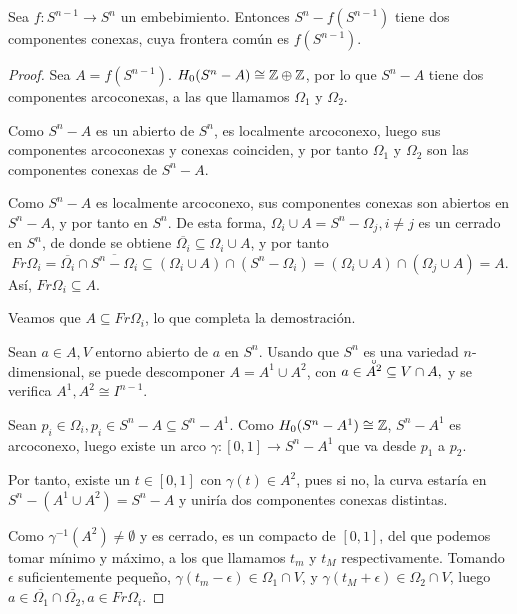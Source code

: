\begin{theorem}
  Sea $f \colon S^{n-1} \to S^n$ un embebimiento. Entonces $S^n - f(S^{n-1})$ tiene dos componentes conexas,
  cuya frontera común es $f(S^{n-1})$.
\end{theorem}

\begin{proof}
  Sea $A = f(S^{n-1})$. $H_0(S^n - A) \cong \mathbb{Z} \oplus \mathbb{Z}$, por lo que $S^n - A$ tiene dos componentes arcoconexas,
  a las que llamamos $\Omega_1$ y $\Omega_2$.

  Como $S^n - A$ es un abierto de $S^n$, es localmente arcoconexo, luego sus componentes arcoconexas y conexas coinciden,
  y por tanto $\Omega_1$ y $\Omega_2$ son las componentes conexas de $S^n - A$.

  Como $S^n - A$ es localmente arcoconexo, sus componentes conexas son abiertos en $S^n -A$, y por tanto en $S^n$.
  De esta forma, $\Omega_i \cup A = S^n - \Omega_j, i \neq j$ es un cerrado en $S^n$, de donde se obtiene
  $\overline{\Omega_i} \subseteq \Omega_i \cup A$, y por tanto
  \[ Fr \Omega_i = \overline{\Omega_i} \cap \overline{S^n - \Omega_i} \subseteq (\Omega_i \cup A) \cap (S^n - \Omega_i) =
  (\Omega_i \cup A) \cap (\Omega_j \cup A) = A. \]
  Así, $Fr \Omega_i \subseteq A$.

  Veamos que $A \subseteq Fr \Omega_i$, lo que completa la demostración.

  Sean $a \in A, V$ entorno abierto de $a$ en $S^n$. Usando que $S^n$ es una variedad $n$-dimensional, se puede descomponer
  $A = A^1 \cup A^2$, con $a \in \interior{A^2} \subseteq V \cap A,$ y se verifica $A^1, A^2 \cong I^{n-1}$.

  Sean $p_i \in \Omega_i, p_i \in S^n - A \subseteq S^n - A^1$. Como $H_0(S^n - A^1) \cong \mathbb{Z}$, $S^n - A^1$ es arcoconexo,
  luego existe un arco $\gamma \colon [0,1] \to S^n - A^1$ que va desde $p_1$ a $p_2$.

  Por tanto, existe un $t \in [0,1]$ con $\gamma(t) \in A^2$, pues si no, la curva estaría en $S^n - (A^1 \cup A^2) = S^n - A$
  y uniría dos componentes conexas distintas.

  Como $\gamma^{-1}(A^2) \neq \emptyset$ y es cerrado, es un compacto de $[0,1]$, del que podemos tomar mínimo y máximo,
  a los que llamamos $t_m$ y $t_M$ respectivamente. Tomando $\epsilon$ suficientemente pequeño, $\gamma(t_m - \epsilon) \in \Omega_1 \cap V$,
  y $\gamma(t_M + \epsilon) \in \Omega_2 \cap V$, luego $a \in \overline{\Omega_1} \cap \overline{\Omega_2}, a \in Fr \Omega_i$.
\end{proof}

